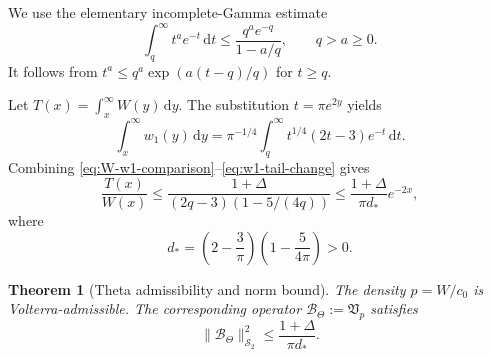 \documentclass[11pt,reqno]{amsart}
\numberwithin{equation}{section}
\newtheorem{theorem}{Theorem}[section]
\newcommand{\1}{\mathbf 1}
\newcommand{\HS}{\mathcal S_2}
\newcommand{\BTheta}{\mathcal B_{\Theta}}
\newcommand{\Vp}{\mathfrak V_p}
\newcommand{\dd}{\,\mathrm d}
\begin{document}
We use the elementary incomplete-Gamma estimate
\begin{equation}\label{eq:incomplete-gamma}
 \int_q^\infty t^ae^{-t}\dd t
 \leq\frac{q^ae^{-q}}{1-a/q},
 \qquad q>a\geq0.
\end{equation}
It follows from
$t^a\leq q^a\exp(a(t-q)/q)$ for $t\geq q$.

Let $T(x)=\int_x^\infty W(y)\dd y$.  The substitution
$t=\pi e^{2y}$ yields
\begin{equation}\label{eq:w1-tail-change}
 \int_x^\infty w_1(y)\dd y
 =\pi^{-1/4}\int_q^\infty
 t^{1/4}(2t-3)e^{-t}\dd t.
\end{equation}
Combining \eqref{eq:W-w1-comparison}--\eqref{eq:w1-tail-change} gives
\begin{equation}\label{eq:tail-density-ratio}
 \frac{T(x)}{W(x)}
 \leq\frac{1+\Delta}{(2q-3)(1-5/(4q))}
 \leq\frac{1+\Delta}{\pi d_*}e^{-2x},
\end{equation}
where
\begin{equation}\label{eq:dstar-def}
 d_*=\left(2-\frac3\pi\right)
 \left(1-\frac5{4\pi}\right)>0.
\end{equation}

\begin{theorem}[Theta admissibility and norm bound]\label{thm:theta-admissible}
The density $p=W/c_0$ is Volterra-admissible.  The corresponding operator
$\BTheta:=\Vp$ satisfies
\begin{equation}\label{eq:theta-HS-bound}
 \boxed{
 \|\BTheta\|_{\HS}^2
 \leq\frac{1+\Delta}{\pi d_*}.}
\end{equation}
\end{theorem}
\end{document}
